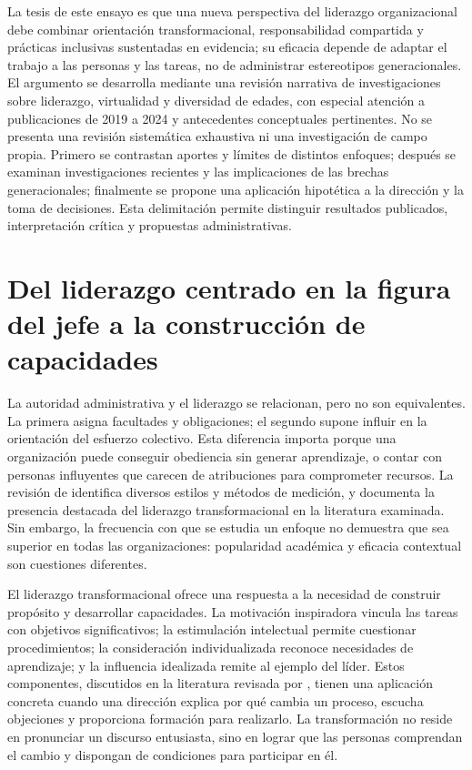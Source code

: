 \documentclass[12pt,letterpaper,oneside]{article}
\begin{document}
La tesis de este ensayo es que una nueva perspectiva del liderazgo organizacional debe combinar orientación transformacional, responsabilidad compartida y prácticas inclusivas sustentadas en evidencia; su eficacia depende de adaptar el trabajo a las personas y las tareas, no de administrar estereotipos generacionales. El argumento se desarrolla mediante una revisión narrativa de investigaciones sobre liderazgo, virtualidad y diversidad de edades, con especial atención a publicaciones de 2019 a 2024 y antecedentes conceptuales pertinentes. No se presenta una revisión sistemática exhaustiva ni una investigación de campo propia. Primero se contrastan aportes y límites de distintos enfoques; después se examinan investigaciones recientes y las implicaciones de las brechas generacionales; finalmente se propone una aplicación hipotética a la dirección y la toma de decisiones. Esta delimitación permite distinguir resultados publicados, interpretación crítica y propuestas administrativas.

\section*{Del liderazgo centrado en la figura del jefe a la construcción de capacidades}

La autoridad administrativa y el liderazgo se relacionan, pero no son equivalentes. La primera asigna facultades y obligaciones; el segundo supone influir en la orientación del esfuerzo colectivo. Esta diferencia importa porque una organización puede conseguir obediencia sin generar aprendizaje, o contar con personas influyentes que carecen de atribuciones para comprometer recursos. La revisión de \textcite{jimenez2020} identifica diversos estilos y métodos de medición, y documenta la presencia destacada del liderazgo transformacional en la literatura examinada. Sin embargo, la frecuencia con que se estudia un enfoque no demuestra que sea superior en todas las organizaciones: popularidad académica y eficacia contextual son cuestiones diferentes.

El liderazgo transformacional ofrece una respuesta a la necesidad de construir propósito y desarrollar capacidades. La motivación inspiradora vincula las tareas con objetivos significativos; la estimulación intelectual permite cuestionar procedimientos; la consideración individualizada reconoce necesidades de aprendizaje; y la influencia idealizada remite al ejemplo del líder. Estos componentes, discutidos en la literatura revisada por \textcite{jimenez2020}, tienen una aplicación concreta cuando una dirección explica por qué cambia un proceso, escucha objeciones y proporciona formación para realizarlo. La transformación no reside en pronunciar un discurso entusiasta, sino en lograr que las personas comprendan el cambio y dispongan de condiciones para participar en él.
\end{document}
